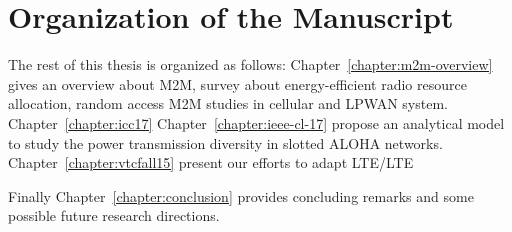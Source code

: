 \section{Organization of the Manuscript}
The rest of this thesis is organized as follows: Chapter~\ref{chapter:m2m-overview} gives an overview about M2M, survey about energy-efficient radio resource allocation, random access M2M studies in cellular and LPWAN system. Chapter~\ref{chapter:icc17} 
Chapter~\ref{chapter:ieee-cl-17} propose an analytical model to study the power transmission diversity in slotted ALOHA networks. 
Chapter~\ref{chapter:vtcfall15} present our efforts to adapt LTE/LTE 

Finally Chapter~\ref{chapter:conclusion} provides concluding remarks and some possible future research directions.